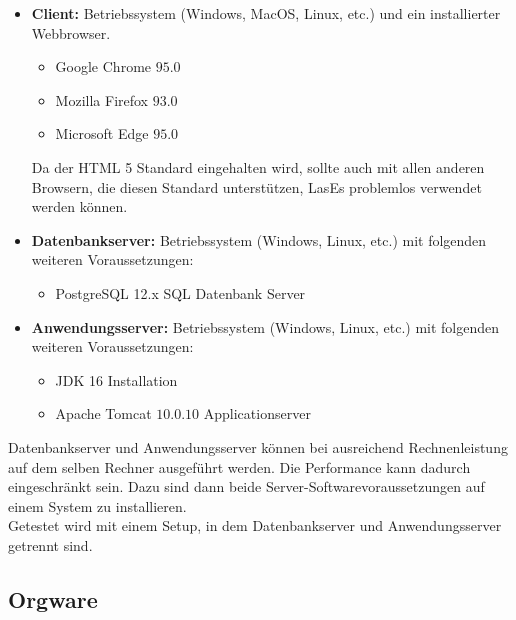 \begin{itemize}

	\item \textbf{Client:} Betriebssystem (Windows, MacOS, Linux, etc.) und ein installierter Webbrowser.

	\begin{itemize}
		\item Google Chrome $95.0$
		\item Mozilla Firefox $93.0$
		\item Microsoft Edge $95.0$
	\end{itemize}

	Da der HTML 5 Standard eingehalten wird, sollte auch mit allen anderen Browsern, die diesen Standard unterstützen, LasEs problemlos verwendet werden können.

	\item \textbf{Datenbankserver:} Betriebssystem (Windows, Linux, etc.) mit folgenden weiteren Voraussetzungen:

	\begin{itemize}
		\item PostgreSQL 12.x SQL Datenbank Server
	\end{itemize}

	\item \textbf{Anwendungsserver:} Betriebssystem (Windows, Linux, etc.) mit folgenden weiteren Voraussetzungen:

	\begin{itemize}
		\item JDK 16 Installation
		\item Apache Tomcat $10.0.10$ Applicationserver
	\end{itemize}

\end{itemize}

	Datenbankserver und Anwendungsserver können bei ausreichend Rechnenleistung auf dem selben Rechner ausgeführt werden. Die Performance kann dadurch eingeschränkt sein. Dazu sind dann beide Server-Softwarevoraussetzungen auf einem System zu installieren.\\
	Getestet wird mit einem Setup, in dem Datenbankserver und Anwendungsserver getrennt sind.

\subsection{Orgware}

